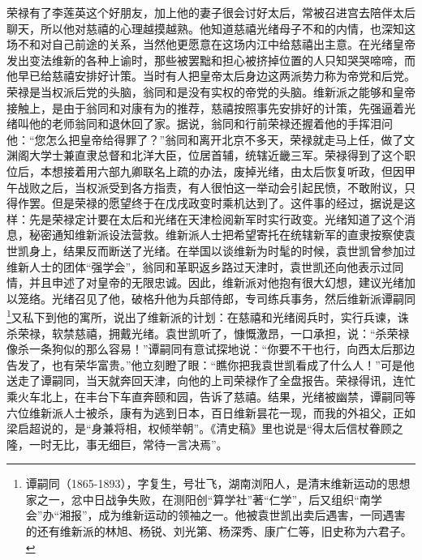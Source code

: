   荣禄有了李莲英这个好朋友，加上他的妻子很会讨好太后，常被召进宫去陪伴太后聊天，所以他对慈禧的心理越摸越熟。他知道慈禧光绪母子不和的内情，也深知这场不和对自己前途的关系，当然他更愿意在这场内江中给慈禧出主意。在光绪皇帝发出变法维新的各种上谕时，那些被罢黜和担心被挤掉位置的人只知哭哭啼啼，而他早已给慈禧安排好计策。当时有人把皇帝太后身边这两派势力称为帝党和后党。荣禄是当权派后党的头脑，翁同和是没有实权的帝党的头脑。维新派之能够和皇帝接触上，是由于翁同和对康有为的推荐，慈禧按照事先安排好的计策，先强逼着光绪叫他的老师翁同和退休回了家。据说，翁同和行前荣禄还握着他的手挥泪问他：“您怎么把皇帝给得罪了？”翁同和离开北京不多天，荣禄就走马上任，做了文渊阁大学士兼直隶总督和北洋大臣，位居首辅，统辖近畿三军。荣禄得到了这个职位后，本想接着用六部九卿联名上疏的办法，废掉光绪，由太后恢复听政，但因甲午战败之后，当权派受到各方指责，有人很怕这一举动会引起民愤，不敢附议，只得作罢。但是荣禄的愿望终于在戊戌政变时乘机达到了。这件事的经过，据说是这样：先是荣禄定计要在太后和光绪在天津检阅新军时实行政变。光绪知道了这个消息，秘密通知维新派设法营救。维新派人士把希望寄托在统辖新军的直隶按察使袁世凯身上，结果反而断送了光绪。在举国以谈维新为时髦的时候，袁世凯曾参加过维新人士的团体“强学会”，翁同和革职返乡路过天津时，袁世凯还向他表示过同情，并且申述了对皇帝的无限忠诚。因此，维新派对他抱有很大幻想，建议光绪加以笼络。光绪召见了他，破格升他为兵部侍郎，专司练兵事务，然后维新派谭嗣同\footnote{谭嗣同（1865-1893），字复生，号壮飞，湖南浏阳人，是清末维新运动的思想家之一，忿中日战争失败，在测阳创“算学社”著“仁学”，后又组织“南学会”办“湘报”，成为维新运动的领袖之一。他被袁世凯出卖后遇害，一同遇害的还有维新派的林旭、杨锐、刘光第、杨深秀、康广仁等，旧史称为六君子。}又私下到他的寓所，说出了维新派的计划：在慈禧和光绪阅兵时，实行兵谏，诛杀荣禄，软禁慈禧，拥戴光绪。袁世凯听了，慷慨激昂，一口承担，说：“杀荣禄像杀一条狗似的那么容易！”谭嗣同有意试探地说：“你要不干也行，向西太后那边告发了，也有荣华富贵。”他立刻瞪了眼：“瞧你把我袁世凯看成了什么人！”可是他送走了谭嗣同，当天就奔回天津，向他的上司荣禄作了全盘报告。荣禄得讯，连忙乘火车北上，在丰台下车直奔颐和园，告诉了慈禧。结果，光绪被幽禁，谭嗣同等六位维新派人士被杀，康有为逃到日本，百日维新昙花一现，而我的外祖父，正如梁启超说的，是“身兼将相，权倾举朝”。《清史稿》里也说是“得太后信杖眷顾之隆，一时无比，事无细巨，常待一言决焉”。\\

